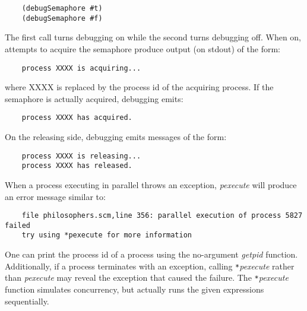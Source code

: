 \begin{verbatim}
    (debugSemaphore #t)
    (debugSemaphore #f)
\end{verbatim}

The first call turns debugging on while the second turns debugging off. When
on, attempts to acquire the semaphore produce output (on stdout) of
the form:

\begin{verbatim}
    process XXXX is acquiring...
\end{verbatim}

where XXXX is replaced by the process id of the acquiring process.
If the semaphore is actually acquired, debugging emits:

\begin{verbatim}
    process XXXX has acquired.
\end{verbatim}

On the releasing side, debugging emits messages of the form:

\begin{verbatim}
    process XXXX is releasing...
    process XXXX has released.
\end{verbatim}

When a process executing in parallel throws an exception, {\it pexecute} will
produce an error message similar to:

\begin{verbatim}
    file philosophers.scm,line 356: parallel execution of process 5827 failed
    try using *pexecute for more information
\end{verbatim}

One can print the process id of a process
using the no-argument {\it getpid} function.
Additionally, if a process terminates with an exception,
calling \verb!*!{\it pexecute} rather than {\it pexecute} may reveal the
exception that caused the failure.
The \verb!*!{\it pexecute} function simulates concurrency, but actually runs the
given expressions sequentially.
